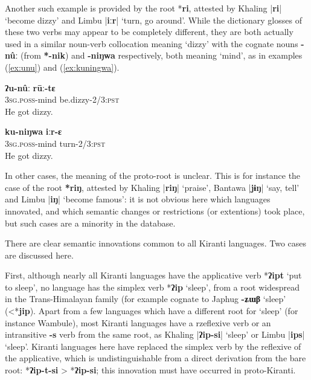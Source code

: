 \documentclass[oneside,a4paper,11pt]{article}
\newcommand{\ipa}[1]{\textbf{{\phon\mbox{#1}}}} %
\newcommand{\dhatu}[2]{|\ipa{#1}| `#2'}
\begin{document}
Another such example is provided by the root *\ipa{ri}, attested by Khaling \dhatu{ri}{become dizzy} and Limbu \dhatu{iːr}{turn, go around}. While the dictionary glosses of these two verbs may appear to be completely different, they are both actually used in a similar noun-verb collocation meaning `dizzy' with the cognate nouns \ipa{-nûː} (from \ipa{*-nik}) and \ipa{-niŋwa} respectively, both meaning `mind', as in examples (\ref{ex:unu}) and (\ref{ex:kuningwa}).

\begin{exe}
\ex \label{ex:unu}
\gll \ipa{ʔu-nûː} \ipa{rūː-tɛ} \\
\textsc{3sg.poss}-mind be.dizzy-\textsc{2/3:pst} \\
\glt He got dizzy.
\end{exe}


\begin{exe}
\ex \label{ex:kuningwa}
\gll \ipa{ku-niŋwa} \ipa{iːr-ɛ} \\
\textsc{3sg.poss}-mind turn-\textsc{2/3:pst} \\
\glt He got dizzy.
\end{exe}



In other cases, the meaning of the proto-root is unclear. This is for instance the case of the root \ipa{*riŋ}, attested by Khaling \dhatu{riŋ}{praise}, Bantawa \dhatu{jɨŋ}{say, tell} and Limbu \dhatu{iŋ}{become famous}: it is not obvious here which languages innovated, and which semantic changes or restrictions (or extentions) took place, but such cases are a minority in the database.

There are clear semantic innovations common to all Kiranti languages. Two cases are discussed here.

First, although nearly all Kiranti languages have the applicative verb *\ipa{ʔipt} `put to sleep', no language has the simplex verb *\ipa{ʔip} `sleep', from a root widespread in the Trans-Himalayan family (for example cognate to Japhug \ipa{-ʑɯβ} `sleep' (<*\ipa{jip}). Apart from a few languages which have a different root for `sleep' (for instance Wambule), most Kiranti languages have a rzeflexive verb or an intransitive \ipa{-s} verb from the same root, as Khaling \dhatu{ʔip-si}{sleep} or Limbu \dhatu{ips}{sleep}. Kiranti languages here have replaced the simplex verb by the reflexive of the applicative, which is undistinguishable from a direct derivation from the bare root: *\ipa{ʔip-t-si} > *\ipa{ʔip-si}; this innovation must have occurred in proto-Kiranti.
\end{document}
